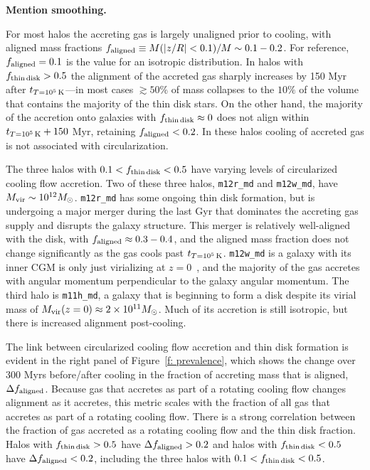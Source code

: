 \documentclass[fleqn,usenatbib]{mnras}
\newcommand{\tcon}{t_{T=10^5\,{\rm K}}}
\begin{document}
\textbf{Mention smoothing.}

For most halos the accreting gas is largely unaligned prior to cooling, with aligned mass fractions $f_{\rm aligned} \equiv M(\vert z/R \vert  <0.1)/M\sim 0.1 - 0.2$.
For reference, $f_{\rm aligned} = 0.1$ is the value for an isotropic distribution.
In halos with $f_{\rm thin\,disk} > 0.5$ the alignment of the accreted gas sharply increases by 150 Myr after $\tcon$---in most cases $\gtrsim 50\%$ of mass collapses to the $10\%$ of the volume that contains the majority of the thin disk stars.
On the other hand, the majority of the accretion onto galaxies with $f_{\rm thin\,disk} \approx 0$ does not align within $\tcon+150$ Myr, retaining $f_{\rm aligned}< 0.2$.
In these halos cooling of accreted gas is not associated with circularization.

The three halos with $0.1 < f_{\rm thin\,disk} < 0.5$ have varying levels of circularized cooling flow accretion.
Two of these three halos, \texttt{m12r\_md} and \texttt{m12w\_md}, have $M_{\rm vir} \sim 10^{12} M_\odot$.
\texttt{m12r\_md} has some ongoing thin disk formation, but is undergoing a major merger during the last Gyr that dominates the accreting gas supply and disrupts the galaxy structure.
This merger is relatively well-aligned with the disk, with $f_{\rm aligned} \approx 0.3-0.4$, and the aligned mass fraction does not change significantly as the gas cools past $\tcon$.
\texttt{m12w\_md} is a galaxy with its inner CGM is only just virializing at $z=0$~\citep{Yu2021}, and the majority of the gas accretes with angular momentum perpendicular to the galaxy angular momentum.
The third halo is \texttt{m11h\_md}, a galaxy that is beginning to form a disk despite its virial mass of $M_{\rm vir}(z=0) \approx 2 \times 10^{11} M_\odot$.
Much of its accretion is still isotropic, but there is increased alignment post-cooling.

The link between circularized cooling flow accretion and thin disk formation is evident in the right panel of Figure~\ref{f: prevalence}, which shows the  change over 300 Myrs before/after cooling in the fraction of accreting mass that is aligned, $\Delta f_{\rm aligned}$.
Because gas that accretes as part of a rotating cooling flow changes alignment as it accretes, this metric scales with the fraction of all gas that accretes as part of a rotating cooling flow.
There is a strong correlation between the fraction of gas accreted as a rotating cooling flow and the thin disk fraction. 
Halos with $f_{\rm thin\,disk} > 0.5$ have $\Delta f_{\rm aligned} > 0.2$ and halos with $f_{\rm thin\,disk} < 0.5$ have $\Delta f_{\rm aligned} < 0.2$, including the three halos with $0.1 < f_{\rm thin\,disk} < 0.5$.
\end{document}
